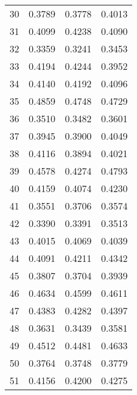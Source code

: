 \begin{table}[ht]
\begin{tabular}{|c|c|c|c|}
30  &  0.3789   &  0.3778   &  0.4013 \\ 
31  &  0.4099   &  0.4238   &  0.4090 \\ 
32  &  0.3359   &  0.3241   &  0.3453 \\ 
33  &  0.4194   &  0.4244   &  0.3952 \\ 
34  &  0.4140   &  0.4192   &  0.4096 \\ 
35  &  0.4859   &  0.4748   &  0.4729 \\ 
36  &  0.3510   &  0.3482   &  0.3601 \\ 
37  &  0.3945   &  0.3900   &  0.4049 \\ 
38  &  0.4116   &  0.3894   &  0.4021 \\ 
39  &  0.4578   &  0.4274   &  0.4793 \\ 
40  &  0.4159   &  0.4074   &  0.4230 \\ 
41  &  0.3551   &  0.3706   &  0.3574 \\ 
42  &  0.3390   &  0.3391   &  0.3513 \\ 
43  &  0.4015   &  0.4069   &  0.4039 \\ 
44  &  0.4091   &  0.4211   &  0.4342 \\ 
45  &  0.3807   &  0.3704   &  0.3939 \\ 
46  &  0.4634   &  0.4599   &  0.4611 \\ 
47  &  0.4383   &  0.4282   &  0.4397 \\ 
48  &  0.3631   &  0.3439   &  0.3581 \\ 
49  &  0.4512   &  0.4481   &  0.4633 \\ 
50  &  0.3764   &  0.3748   &  0.3779 \\ 
51  &  0.4156   &  0.4200   &  0.4275 \\ 
\hline
 \end{tabular}
  \end{table}


